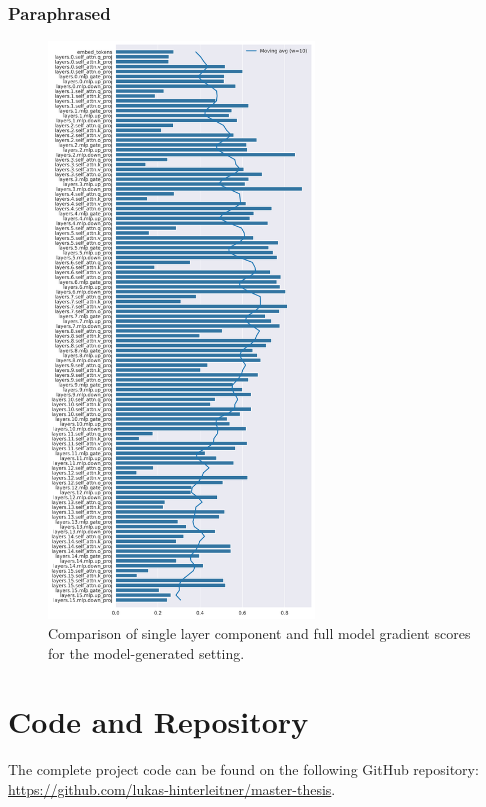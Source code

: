 \subsubsection{Paraphrased}
\begin{figure}[ht]
    \centering
    \includegraphics[width=0.63\textwidth]{figures/results/model-generated/layer_comparison_full_gradient.png}
    \caption{Comparison of single layer component and full model gradient scores for the model-generated setting.}
    \label{fig:model_generated_layer_comparison_full_gradient}
\end{figure}

\section{Code and Repository}
The complete project code can be found on the following GitHub repository: \url{https://github.com/lukas-hinterleitner/master-thesis}.
